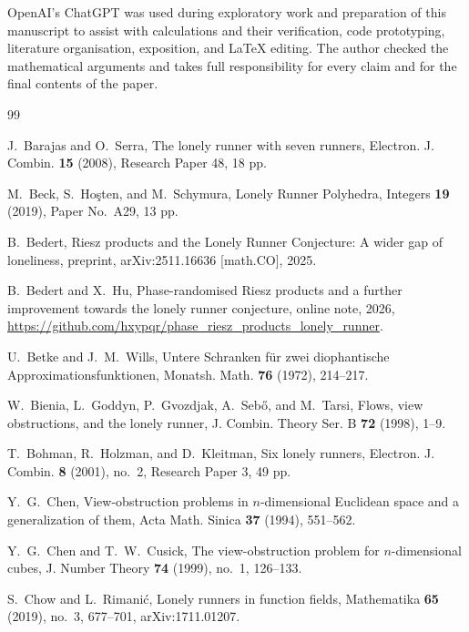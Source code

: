 \documentclass[11pt,reqno]{amsart}
\numberwithin{equation}{section}
\theoremstyle{definition}
\theoremstyle{remark}
\begin{document}
OpenAI's ChatGPT was used during exploratory work and preparation of this manuscript to assist with calculations and their verification, code prototyping, literature organisation, exposition, and LaTeX editing.  The author checked the mathematical arguments and takes full responsibility for every claim and for the final contents of the paper.

\begin{thebibliography}{99}

J.~Barajas and O.~Serra,
\newblock The lonely runner with seven runners,
\newblock Electron. J. Combin. \textbf{15} (2008), Research Paper 48, 18 pp.

M.~Beck, S.~Ho\c{s}ten, and M.~Schymura,
\newblock Lonely Runner Polyhedra,
\newblock Integers \textbf{19} (2019), Paper No.~A29, 13 pp.

B.~Bedert,
\newblock Riesz products and the Lonely Runner Conjecture: A wider gap of loneliness,
\newblock preprint, arXiv:2511.16636 [math.CO], 2025.

B.~Bedert and X.~Hu,
\newblock Phase-randomised Riesz products and a further improvement towards the lonely runner conjecture,
\newblock online note, 2026,
\newblock \url{https://github.com/hxypqr/phase_riesz_products_lonely_runner}.

U.~Betke and J.~M.~Wills,
\newblock Untere Schranken f\"ur zwei diophantische Approximationsfunktionen,
\newblock Monatsh. Math. \textbf{76} (1972), 214--217.

W.~Bienia, L.~Goddyn, P.~Gvozdjak, A.~Seb\H{o}, and M.~Tarsi,
\newblock Flows, view obstructions, and the lonely runner,
\newblock J. Combin. Theory Ser. B \textbf{72} (1998), 1--9.

T.~Bohman, R.~Holzman, and D.~Kleitman,
\newblock Six lonely runners,
\newblock Electron. J. Combin. \textbf{8} (2001), no.~2, Research Paper 3, 49 pp.

Y.~G.~Chen,
\newblock View-obstruction problems in $n$-dimensional Euclidean space and a generalization of them,
\newblock Acta Math. Sinica \textbf{37} (1994), 551--562.

Y.~G.~Chen and T.~W.~Cusick,
\newblock The view-obstruction problem for $n$-dimensional cubes,
\newblock J. Number Theory \textbf{74} (1999), no.~1, 126--133.

S.~Chow and L.~Rimani\'c,
\newblock Lonely runners in function fields,
\newblock Mathematika \textbf{65} (2019), no.~3, 677--701,
\newblock arXiv:1711.01207.


\end{thebibliography}
\end{document}
